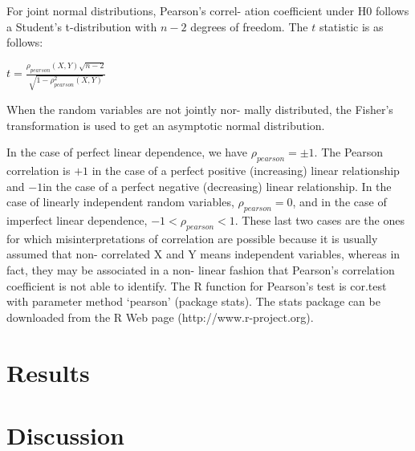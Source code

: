 \documentclass[a4paper]{article}
\begin{document}
For joint normal distributions, Pearson’s correl- ation coefficient under H0 follows a Student’s t-distribution with $ n -2 $ degrees of freedom. The $t$ statistic is as follows:

$t = \frac{\rho_{pearson}(X, Y) \sqrt{n -2}}{\sqrt{1- \rho^{2}_{pearson}(X, Y)}}$

When the random variables are not jointly nor- mally distributed, the Fisher’s transformation is used to get an asymptotic normal distribution.

In the case of perfect linear dependence, we have $\rho_{pearson} = \pm1$. The Pearson correlation is $+1$ in the case of a perfect positive (increasing) linear relationship and $-1 $in the case of a perfect negative (decreasing) linear relationship. In the case of linearly independent random variables, $\rho_{pearson} = 0$, and in the case of imperfect linear dependence, $-1 < \rho_{pearson} < 1$. These last two cases are the ones for which misinterpretations of correlation are possible because it is usually assumed that non- correlated X and Y means independent variables, whereas in fact, they may be associated in a non- linear fashion that Pearson’s correlation coefficient is not able to identify.
The R function for Pearson’s test is cor.test with parameter method `pearson' (package stats). The stats package can be downloaded from the R  Web page (http://www.r-project.org).

\section*{Results}

\section*{Discussion}


\end{document}
